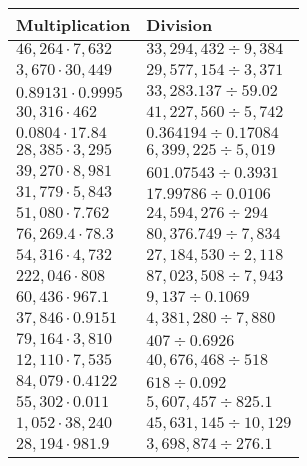 \begin{longtable}[]{@{}ll@{}}
\toprule
Multiplication & Division\tabularnewline
\midrule
\endhead
\(46,264\cdot7,632\) & \(33,294,432÷9,384\)\tabularnewline
\(3,670\cdot30,449\) & \(29,577,154÷3,371\)\tabularnewline
\(0.89131\cdot0.9995\) & \(33,283.137÷59.02\)\tabularnewline
\(30,316\cdot462\) & \(41,227,560÷5,742\)\tabularnewline
\(0.0804\cdot17.84\) & \(0.364194÷0.17084\)\tabularnewline
\(28,385\cdot3,295\) & \(6,399,225÷5,019\)\tabularnewline
\(39,270\cdot8,981\) & \(601.07543÷0.3931\)\tabularnewline
\(31,779\cdot5,843\) & \(17.99786 ÷0.0106\)\tabularnewline
\(51,080\cdot7.762\) & \(24,594,276÷294\)\tabularnewline
\(76,269.4\cdot 78.3\) & \(80,376.749÷7,834\)\tabularnewline
\(54,316\cdot4,732\) & \(27,184,530÷2,118\)\tabularnewline
\(222,046\cdot808\) & \(87,023,508÷7,943\)\tabularnewline
\(60,436\cdot967.1\) & \(9,137÷0.1069\)\tabularnewline
\(37,846\cdot0.9151\) & \(4,381,280÷7,880\)\tabularnewline
\(79,164\cdot3,810\) & \(407÷0.6926\)\tabularnewline
\(12,110\cdot7,535\) & \(40,676,468÷518\)\tabularnewline
\(84,079\cdot0.4122\) & \(618÷0.092\)\tabularnewline
\(55,302\cdot0.011\) & \(5,607,457÷825.1\)\tabularnewline
\(1,052\cdot38,240\) & \(45,631,145÷10,129\)\tabularnewline
\(28,194\cdot 981.9\) & \(3,698,874÷276.1\)\tabularnewline
\bottomrule
\end{longtable}
